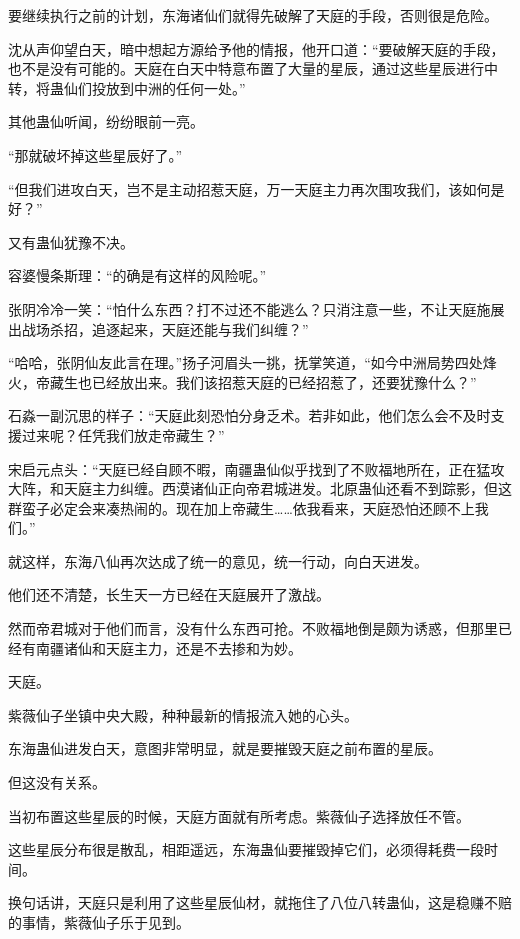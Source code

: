 
\begin{this_body}

要继续执行之前的计划，东海诸仙们就得先破解了天庭的手段，否则很是危险。

沈从声仰望白天，暗中想起方源给予他的情报，他开口道：“要破解天庭的手段，也不是没有可能的。天庭在白天中特意布置了大量的星辰，通过这些星辰进行中转，将蛊仙们投放到中洲的任何一处。”

其他蛊仙听闻，纷纷眼前一亮。

“那就破坏掉这些星辰好了。”

“但我们进攻白天，岂不是主动招惹天庭，万一天庭主力再次围攻我们，该如何是好？”

又有蛊仙犹豫不决。

容婆慢条斯理：“的确是有这样的风险呢。”

张阴冷冷一笑：“怕什么东西？打不过还不能逃么？只消注意一些，不让天庭施展出战场杀招，追逐起来，天庭还能与我们纠缠？”

“哈哈，张阴仙友此言在理。”扬子河眉头一挑，抚掌笑道，“如今中洲局势四处烽火，帝藏生也已经放出来。我们该招惹天庭的已经招惹了，还要犹豫什么？”

石淼一副沉思的样子：“天庭此刻恐怕分身乏术。若非如此，他们怎么会不及时支援过来呢？任凭我们放走帝藏生？”

宋启元点头：“天庭已经自顾不暇，南疆蛊仙似乎找到了不败福地所在，正在猛攻大阵，和天庭主力纠缠。西漠诸仙正向帝君城进发。北原蛊仙还看不到踪影，但这群蛮子必定会来凑热闹的。现在加上帝藏生……依我看来，天庭恐怕还顾不上我们。”

就这样，东海八仙再次达成了统一的意见，统一行动，向白天进发。

他们还不清楚，长生天一方已经在天庭展开了激战。

然而帝君城对于他们而言，没有什么东西可抢。不败福地倒是颇为诱惑，但那里已经有南疆诸仙和天庭主力，还是不去掺和为妙。

天庭。

紫薇仙子坐镇中央大殿，种种最新的情报流入她的心头。

东海蛊仙进发白天，意图非常明显，就是要摧毁天庭之前布置的星辰。

但这没有关系。

当初布置这些星辰的时候，天庭方面就有所考虑。紫薇仙子选择放任不管。

这些星辰分布很是散乱，相距遥远，东海蛊仙要摧毁掉它们，必须得耗费一段时间。

换句话讲，天庭只是利用了这些星辰仙材，就拖住了八位八转蛊仙，这是稳赚不赔的事情，紫薇仙子乐于见到。


\end{this_body}
